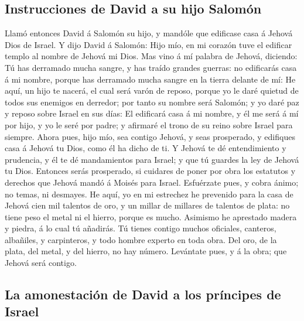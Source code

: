 \hypertarget{instrucciones-de-david-a-su-hijo-salomuxf3n}{%
\subsection{Instrucciones de David a su hijo
Salomón}\label{instrucciones-de-david-a-su-hijo-salomuxf3n}}

 Llamó entonces David á Salomón su hijo, y mandóle que
edificase casa á Jehová Dios de Israel.  Y dijo David á
Salomón: Hijo mío, en mi corazón tuve el edificar templo al nombre de
Jehová mi Dios.  Mas vino á mí palabra de Jehová,
diciendo: Tú has derramado mucha sangre, y has traído grandes guerras:
no edificarás casa á mi nombre, porque has derramado mucha sangre en la
tierra delante de mí:  He aquí, un hijo te nacerá, el cual
será varón de reposo, porque yo le daré quietud de todos sus enemigos en
derredor; por tanto su nombre será Salomón; y yo daré paz y reposo sobre
Israel en sus días:  El edificará casa á mi nombre, y él
me será á mí por hijo, y yo le seré por padre; y afirmaré el trono de su
reino sobre Israel para siempre.  Ahora pues, hijo mío,
sea contigo Jehová, y seas prosperado, y edifiques casa á Jehová tu
Dios, como él ha dicho de ti.  Y Jehová te dé
entendimiento y prudencia, y él te dé mandamientos para Israel; y que tú
guardes la ley de Jehová tu Dios.  Entonces serás
prosperado, si cuidares de poner por obra los estatutos y derechos que
Jehová mandó á Moisés para Israel. Esfuérzate pues, y cobra ánimo; no
temas, ni desmayes.  He aquí, yo en mi estrechez he
prevenido para la casa de Jehová cien mil talentos de oro, y un millar
de millares de talentos de plata: no tiene peso el metal ni el hierro,
porque es mucho. Asimismo he aprestado madera y piedra, á lo cual tú
añadirás.  Tú tienes contigo muchos oficiales, canteros,
albañiles, y carpinteros, y todo hombre experto en toda obra.
 Del oro, de la plata, del metal, y del hierro, no hay
número. Levántate pues, y á la obra; que Jehová será contigo.

\hypertarget{la-amonestaciuxf3n-de-david-a-los-pruxedncipes-de-israel}{%
\subsection{La amonestación de David a los príncipes de
Israel}\label{la-amonestaciuxf3n-de-david-a-los-pruxedncipes-de-israel}}

